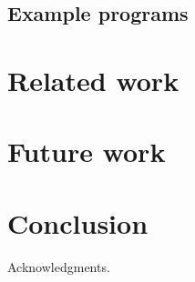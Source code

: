\documentclass{sigplanconf}
\begin{document}
\subsection{Example programs}

\section{Related work}

\section{Future work}

\section{Conclusion}

\acks

Acknowledgments.








\end{document}
